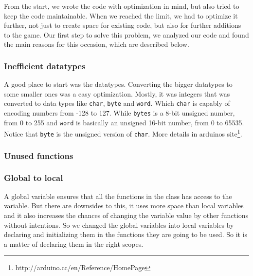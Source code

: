 From the start, we wrote the code with optimization in mind, but also tried to keep the code maintainable. When we reached the limit, we had to optimize it further, not just to create space for existing code, but also for further additions to the game. Our first step to solve this problem, we analyzed our code and found the main reasons for this occasion, which are described below.


\subsubsection{Inefficient datatypes}
A good place to start was the datatypes. Converting the bigger datatypes
to some smaller ones was a easy optimization. Mostly, it was integers that
was converted to data types like {\tt char}, {\tt byte} and {\tt word}.
Which {\tt char} is capably of encoding numbers from -128 to 127. While
{\tt bytes} is a 8-bit unsigned number, from 0 to 255 and {\tt word} is
basically an unsigned 16-bit number, from 0 to 65535. Notice that {\tt byte}
is the unsigned version of {\tt char}. More details in arduinos site\footnote{http://arduino.cc/en/Reference/HomePage}.

\subsubsection{Unused functions}

\subsubsection{Global to local}
A global variable ensures that all the
functions in the class has access to the variable. But there are downsides
to this, it uses more space than local variables and it also increases the chances
of changing the variable value by other functions without intentions. So we changed
the global variables into local variables by declaring and initializing them in the
functions they are going to be used. So it is a matter of declaring them in the right
scopes.


